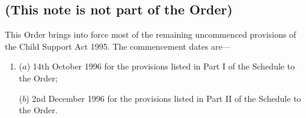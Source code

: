 \documentclass[a4paper]{article}
\newcommand{\parthead}{}
\begin{document}
\renewcommand\parthead{--- Explanatory Note}

\subsection*{(This note is not part of the Order)}

This Order brings into force most of the remaining uncommenced provisions of the Child Support Act 1995. The commencement dates are—
\begin{enumerate}\item[]
 ($a$) 14th October 1996 for the provisions listed in Part I of the Schedule to the Order;

 ($b$) 2nd December 1996 for the provisions listed in Part II of the Schedule to the Order.
\end{enumerate}
\end{document}
